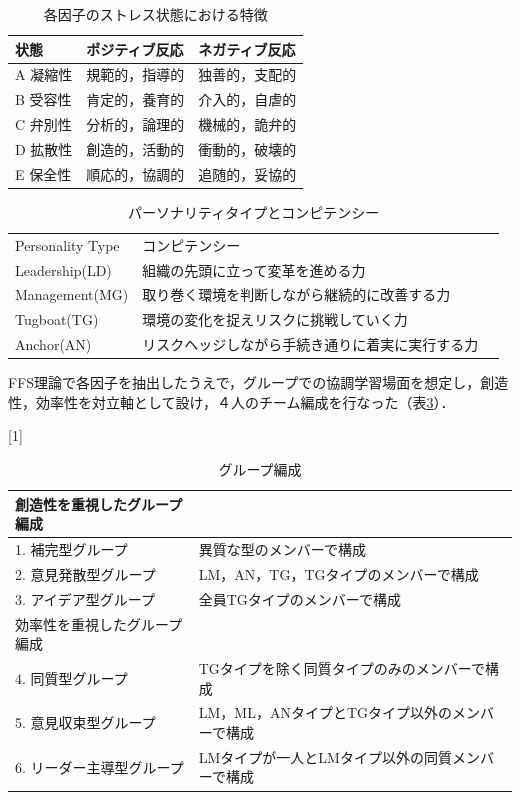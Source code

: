 \documentclass{funthesis}
\begin{document}
\begin{table}[H]
\begin{center}
  \caption{各因子のストレス状態における特徴}
  \begin{tabular}{lll} \hline
    状態 & ポジティブ反応 & ネガティブ反応\tabularnewline \hline
    A 凝縮性& 規範的，指導的 & 
    独善的，支配的\tabularnewline
    B 受容性 &肯定的，養育的 & 
    介入的，自虐的\tabularnewline
    C 弁別性&分析的，論理的 &
    機械的，詭弁的\tabularnewline
    D 拡散性&創造的，活動的 &
    衝動的，破壊的\tabularnewline
    E 保全性&順応的，協調的 &
    追随的，妥協的\tabularnewline
    \hline
  \end{tabular}

  \label{FFS理論}
  \end{center}
\end{table}

\begin{table}[H]
\begin{center}

  \caption{パーソナリティタイプとコンピテンシー}
  
  \begin{tabular}{lll} \hline
    Personality Type &  コンピテンシー\tabularnewline
   Leadership(LD)& 組織の先頭に立って変革を進める力  \tabularnewline
    Management(MG) & 取り巻く環境を判断しながら継続的に改善する力 \tabularnewline
    Tugboat(TG)& 環境の変化を捉えリスクに挑戦していく力\tabularnewline
    Anchor(AN)&リスクヘッジしながら手続き通りに着実に実行する力 \tabularnewline
    \hline
  \end{tabular}
  \label{FFS理論2}
  \end{center}
\end{table}

FFS理論で各因子を抽出したうえで，グループでの協調学習場面を想定し，創造性，効率性を対立軸として設け，４人のチーム編成を行なった（表\ref{FFS理論3}）．

\begin{table}[H]
\begin{center}

  \caption{グループ編成}
  \scalebox{0.9}[1]{
  \begin{tabular}{ll} \hline
    創造性を重視したグループ編成\tabularnewline \hline
   1. 補完型グループ& 異質な型のメンバーで構成  \tabularnewline
   2. 意見発散型グループ & LM，AN，TG，TGタイプのメンバーで構成 \tabularnewline
    3. アイデア型グループ& 全員TGタイプのメンバーで構成\tabularnewline \hline
    効率性を重視したグループ編成 \tabularnewline \hline
    4. 同質型グループ& TGタイプを除く同質タイプのみのメンバーで構成  \tabularnewline
    5. 意見収束型グループ & LM，ML，ANタイプとTGタイプ以外のメンバーで構成 \tabularnewline
    6. リーダー主導型グループ&LMタイプが一人とLMタイプ以外の同質メンバーで構成\tabularnewline
    \hline
  \end{tabular}
  }
  \label{FFS理論3}
  \end{center}
\end{table}
\end{document}

